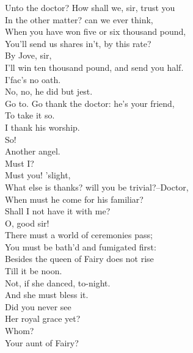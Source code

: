 \documentclass{memoir}
\begin{document}
\begin{drama*}
 Unto the doctor? How shall we, sir, trust you\\
 In the other matter? can we ever think,\\
 When you have won five or six thousand pound,\\
 You'll send us shares in't, by this rate?\\
\dapperspeaks {} By Jove, sir,\\
 I'll win ten thousand pound, and send you half.\\
 I'fac's no oath.\\
\subtlespeaks {} No, no, he did but jest.\\
\facespeaks  Go to. Go thank the doctor: he's your friend,\\
 To take it so.\\
\dapperspeaks {} I thank his worship.\\
\facespeaks {} So!\\
 Another angel.\\
\dapperspeaks {} Must I?\\
\facespeaks {} Must you! 'slight,\\
 What else is thanks? will you be trivial?--Doctor,\\
 When must he come for his familiar?\\
\dapperspeaks {} Shall I not have it with me?\\
\subtlespeaks  O, good sir!\\
 There must a world of ceremonies pass;\\
 You must be bath'd and fumigated first:\\
 Besides the queen of Fairy does not rise\\
 Till it be noon.\\
\facespeaks {} Not, if she danced, to-night.\\
\subtlespeaks  And she must bless it.\\
\facespeaks {} Did you never see\\
 Her royal grace yet?\\
\dapperspeaks {} Whom?\\
\facespeaks {} Your aunt of Fairy?\\

\end{drama*}
\end{document}
